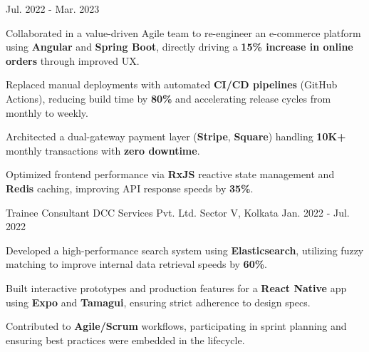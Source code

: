\begin{cventries}
    {Jul. 2022 - Mar. 2023}
    {
      \begin{cvitems}
        \setlength\itemsep{3.5mm}
        \item {Collaborated in a value-driven Agile team to re-engineer an e-commerce platform using \textbf{Angular} and \textbf{Spring Boot}, directly driving a \textbf{15\% increase in online orders} through improved UX.}
        \item {Replaced manual deployments with automated \textbf{CI/CD pipelines} (GitHub Actions), reducing build time by \textbf{80\%} and accelerating release cycles from monthly to weekly.}
        \item {Architected a dual-gateway payment layer (\textbf{Stripe}, \textbf{Square}) handling \textbf{10K+} monthly transactions with \textbf{zero downtime}.}
        \item {Optimized frontend performance via \textbf{RxJS} reactive state management and \textbf{Redis} caching, improving API response speeds by \textbf{35\%}.}
      \end{cvitems}
    }
    \vspace{8mm}
  \cventry
    {Trainee Consultant}
    {DCC Services Pvt. Ltd.}
    {Sector V, Kolkata}
    {Jan. 2022 - Jul. 2022}
    {
      \begin{cvitems}
        \setlength\itemsep{2.5mm}
        \item {Developed a high-performance search system using \textbf{Elasticsearch}, utilizing fuzzy matching to improve internal data retrieval speeds by \textbf{60\%}.}
        \item {Built interactive prototypes and production features for a \textbf{React Native} app using \textbf{Expo} and \textbf{Tamagui}, ensuring strict adherence to design specs.}
        \item {Contributed to \textbf{Agile/Scrum} workflows, participating in sprint planning and ensuring best practices were embedded in the lifecycle.}
      \end{cvitems}
    }
\end{cventries}